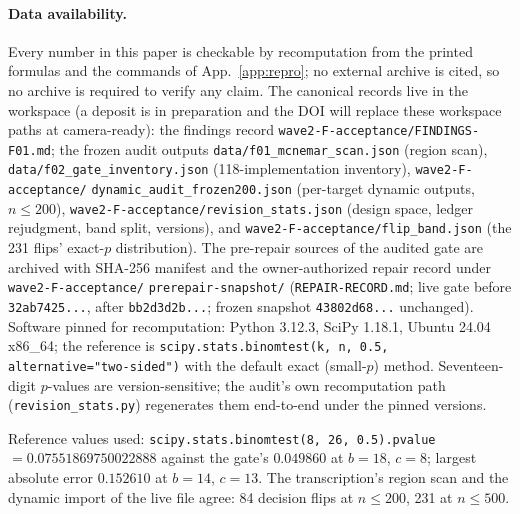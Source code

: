 \documentclass[10pt]{article}
\newcommand{\code}[1]{\texttt{#1}}
\begin{document}
\paragraph{Data availability.} Every number in this paper is checkable by
recomputation from the printed formulas and the commands of
App.~\ref{app:repro}; no external archive is cited, so no archive is required
to verify any claim. The canonical records live in the workspace
(a deposit is in preparation and the DOI will replace these workspace paths at
camera-ready): the findings record
\code{wave2-F-acceptance/FINDINGS-F01.md}; the frozen audit outputs
\code{data/f01\_mcnemar\_scan.json} (region scan),
\code{data/f02\_gate\_inventory.json} (118-implementation inventory),
\code{wave2-F-acceptance/}
\code{dynamic\_audit\_frozen200.json} (per-target dynamic
outputs, $n\le200$), \code{wave2-F-acceptance/revision\_stats.json} (design
space, ledger rejudgment, band split, versions), and
\code{wave2-F-acceptance/flip\_band.json} (the 231 flips' exact-$p$
distribution). The pre-repair sources of the audited gate are archived with
SHA-256 manifest and the owner-authorized repair record under
\code{wave2-F-acceptance/} \code{prerepair-\allowbreak snapshot/}
(\code{REPAIR-\allowbreak RECORD.md}; live gate before \code{32ab7425...},
after \code{bb2d3d2b...}; frozen snapshot \code{43802d68...} unchanged). Software pinned for recomputation: Python 3.12.3, SciPy
1.18.1, Ubuntu 24.04 x86\_64; the reference is
\code{scipy.stats.binomtest(k, n, 0.5, alternative="two-sided")} with the
default exact (small-$p$) method. Seventeen-digit $p$-values are
version-sensitive; the audit's own recomputation path
(\code{revision\_stats.py}) regenerates them end-to-end under the pinned
versions.

Reference values used: \code{scipy.stats.binomtest(8, 26, 0.5).pvalue}
$= 0.07551869750022888$ against the gate's $0.049860$ at $b{=}18$, $c{=}8$;
largest absolute error $0.152610$ at $b{=}14$, $c{=}13$. The transcription's
region scan and the dynamic import of the live file agree: 84 decision flips
at $n\le200$, 231 at $n\le500$.


\end{document}
